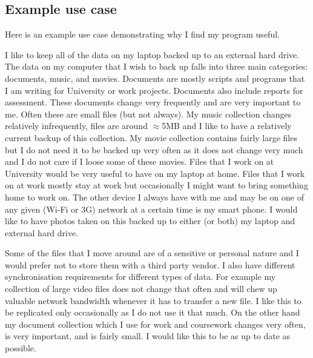 \documentclass[12pt]{article}
\begin{document}


\subsection{Example use case}
Here is an example use case demonstrating why I find my program useful.

I like to keep all of the data on my laptop backed up to an
external hard drive. The data on my computer that I wish
to back up falls into three main categories: documents, music, and movies.
Documents are mostly scripts and programs that I am writing for
University or work projects. Documents also include reports for
assessment. These documents change very frequently and are very important
to me. Often these are small files (but not always). My music collection
changes relatively infrequently, files are around $\approx$5MB and I like to
have a relatively current backup of this collection. My movie collection
contains fairly large files but I do not need it to be backed up very often
as it does not change very much and I do not care if I loose some of these
movies. Files that I work on at University would be very useful to have
on my laptop at home. Files that I work on at work mostly stay at work
but occasionally I might want to bring something home to work on.
The other device I always have with me and may be on one of any given
(Wi-Fi or 3G) network at a certain time is my smart phone. I would like
to have photos taken on this backed up to either (or both) my laptop and
external hard drive. 

Some of the files that I move around are of a sensitive or personal nature
and I would prefer not to store them with a third party vendor.
I also have different synchronisation requirements for different
types of data. 
For example my collection of large video files does not change that often
and will chew up valuable network bandwidth whenever it has to transfer
a new file. I like this to be replicated only occasionally as I do not
use it that much. On the other hand my document collection which I use
for work and coursework changes very often, is very important, and
is fairly small. I would like this to be as up to date as possible.
\end{document}

